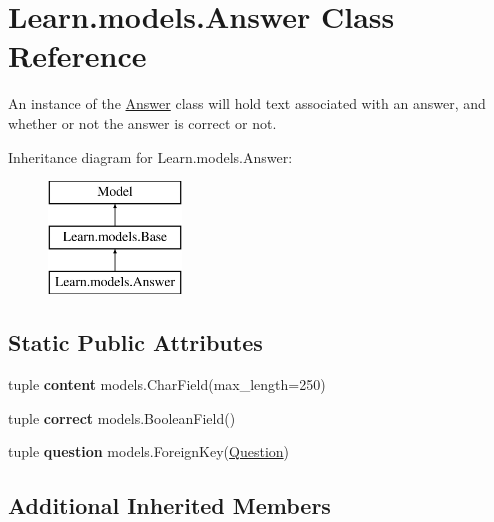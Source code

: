 \hypertarget{class_learn_1_1models_1_1_answer}{\section{Learn.\-models.\-Answer Class Reference}
\label{class_learn_1_1models_1_1_answer}
}


An instance of the \hyperlink{class_learn_1_1models_1_1_answer}{Answer} class will hold text associated with an answer, and whether or not the answer is correct or not.  


Inheritance diagram for Learn.\-models.\-Answer\-:\begin{figure}[H]
\begin{center}
\leavevmode
\includegraphics[height=3.000000cm]{class_learn_1_1models_1_1_answer}
\end{center}
\end{figure}
\subsection*{Static Public Attributes}
\begin{DoxyCompactItemize}
\item 
\hypertarget{class_learn_1_1models_1_1_answer_ac98b555cd170b3623cca09ecfa9d932b}{tuple {\bfseries content} models.\-Char\-Field(max\-\_\-length=250)}\label{class_learn_1_1models_1_1_answer_ac98b555cd170b3623cca09ecfa9d932b}

\item 
\hypertarget{class_learn_1_1models_1_1_answer_a0ec1628ee2d08f161cc25a82eea8ebb6}{tuple {\bfseries correct} models.\-Boolean\-Field()}\label{class_learn_1_1models_1_1_answer_a0ec1628ee2d08f161cc25a82eea8ebb6}

\item 
\hypertarget{class_learn_1_1models_1_1_answer_aa1194d87ee2fdbced15a5b551cf5e364}{tuple {\bfseries question} models.\-Foreign\-Key(\hyperlink{class_learn_1_1models_1_1_question}{Question})}\label{class_learn_1_1models_1_1_answer_aa1194d87ee2fdbced15a5b551cf5e364}

\end{DoxyCompactItemize}
\subsection*{Additional Inherited Members}


